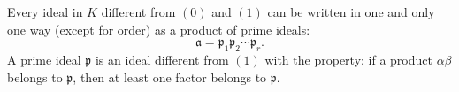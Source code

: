 Every ideal in $K$ different from $(0)$ and $(1)$ can be written in one and only one way (except for order) as a product of prime ideals:
$$\mathfrak{a} = \mathfrak{p}_1 \mathfrak{p}_2 \cdots \mathfrak{p}_r.$$
A prime ideal $\mathfrak{p}$ is an ideal different from $(1)$ with the property: if a product $\alpha\beta$ belongs to $\mathfrak{p}$, then at least one factor belongs to $\mathfrak{p}$.
